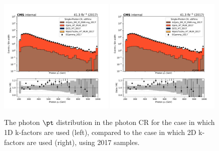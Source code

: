 \begin{figure}
    \begin{center}
        \includegraphics[width=0.49\textwidth]{fig/datamc/cr_g_vbf/cr_g_vbf_photon_pt0_losf_2017.pdf}
        \includegraphics[width=0.49\textwidth]{fig/datamc_2dkfac/cr_g_vbf/cr_g_vbf_photon_pt0_losf_2017.pdf} 
        \caption{The photon $\pt$ distribution in the photon CR for the case in which 1D k-factors are used (left), 
        compared to the case in which 2D k-factors are used (right), using 2017 samples.}
        \label{fig:photon_pt_2017}
    \end{center}
\end{figure}

